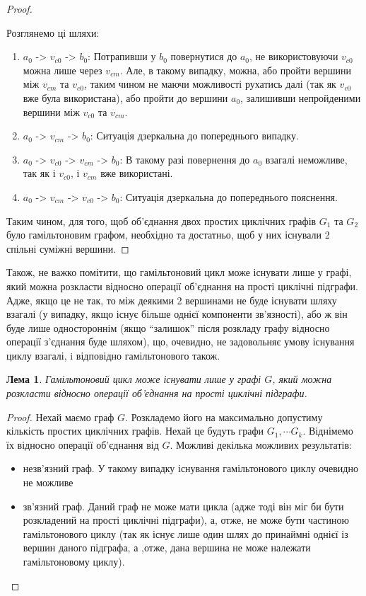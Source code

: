 \documentclass[a4paper,14pt,ukrainian]{extarticle}
\newtheorem{lemma}{Лема}
\begin{document}
\begin{proof}
\begin{enumerate}
                Розглянемо ці шляхи:
                \begin{enumerate}
                    \item{$a_0$ -> $v_{c0}$ -> $b_0$:} Потрапивши у $b_0$ повернутися до $a_0$, не використовуючи $v_{c0}$ можна лише через $v_{cm}$.
                        Але, в такому випадку, можна, або пройти вершини між $v_{cm}$ та $v_{c0}$, таким чином не маючи можливості рухатись далі (так як $v_{c0}$ вже була використана), або пройти до вершини $a_0$, залишивши непройденими вершини між $v_{c0}$ та $v_{cm}$.
                    \item{$a_0$ -> $v_{cm}$ -> $b_0$:} Ситуація дзеркальна до попереднього випадку.
                    \item{$a_0$ -> $v_{c0}$ -> $v_{cm}$ -> $b_0$:} В такому разі повернення до $a_0$ взагалі неможливе, так як і $v_{c0}$, і $v_{cm}$ вже використані.
                    \item{$a_0$ -> $v_{cm}$ -> $v_{c0}$ -> $b_0$:} Ситуація дзеркальна до попереднього пояснення.
                \end{enumerate}
        \end{enumerate}
        Таким чином, для того, щоб об’єднання двох простих циклічних графів $G_1$ та $G_2$ було гамільтоновим графом, необхідно та достатньо, щоб у них існували 2 спільні суміжні вершини.
    \end{proof}
    Також, не важко помітити, що гамільтоновий цикл може існувати лише у графі, який можна розкласти відносно операції об’єднання на прості циклічні підграфи.
    Адже, якщо це не так, то між деякими 2 вершинами не буде існувати шляху взагалі (у випадку, якщо існує більше однієї компоненти зв’язності), або ж він буде лише одностороннім (якщо ``залишок'' після розкладу графу відносно операції з’єднання буде шляхом), що, очевидно, не задовольняє умову існування циклу взагалі, i відповідно гамільтонового також.
    \begin{lemma}
    \label{FullDecompositionOnly}
        Гамільтоновий цикл може існувати лише у графі $G$, який можна розкласти відносно операції об’єднання на прості циклічні підграфи.
    \end{lemma}
    \begin{proof}
        Нехай маємо граф $G$.
        Розкладемо його на максимально допустиму кількість простих циклічних графів.
        Нехай це будуть графи $G_1, \cdots G_k$.
        Віднімемо їх відносно операції об’єднання від $G$.
        Можливі декілька можливих результатів:
        \begin{itemize}
            \item незв’язний граф.
                У такому випадку існування гамільтонового циклу очевидно не можливе
            \item зв’язний граф. 
                Даний граф не може мати цикла (адже тоді він міг би бути розкладений на прості циклічні підграфи), а, отже, не може бути частиною гамільтонового циклу (так як існує лише один шлях до принаймні однієї із вершин даного підграфа, а ,отже, дана вершина не може належати гамільтоновому циклу).
        \end{itemize}
    \end{proof}
\end{document}
